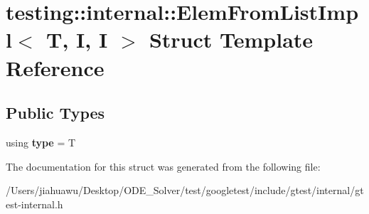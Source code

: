 \hypertarget{structtesting_1_1internal_1_1_elem_from_list_impl_3_01_t_00_01_i_00_01_i_01_4}{}\section{testing\+:\+:internal\+:\+:Elem\+From\+List\+Impl$<$ T, I, I $>$ Struct Template Reference}
\label{structtesting_1_1internal_1_1_elem_from_list_impl_3_01_t_00_01_i_00_01_i_01_4}
\subsection*{Public Types}
\begin{DoxyCompactItemize}
\item 
\mbox{\label{structtesting_1_1internal_1_1_elem_from_list_impl_3_01_t_00_01_i_00_01_i_01_4_ab1552e339cc1ff1e0aa448d684ffaf39}} 
using {\bfseries type} = T
\end{DoxyCompactItemize}


The documentation for this struct was generated from the following file\+:\begin{DoxyCompactItemize}
\item 
/\+Users/jiahuawu/\+Desktop/\+O\+D\+E\+\_\+\+Solver/test/googletest/include/gtest/internal/gtest-\/internal.\+h\end{DoxyCompactItemize}
